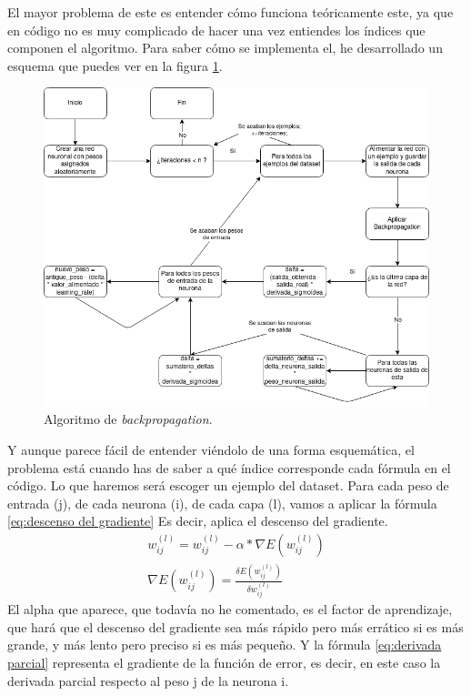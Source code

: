 El mayor problema de este es entender cómo funciona teóricamente este, ya que en código no es muy complicado de hacer una vez entiendes los índices que componen el algoritmo. Para saber cómo se implementa el, he desarrollado un esquema que puedes ver en la figura \ref{Algoritmo de backpropagation}.
\begin{figure}[h]
	\centering
	\includegraphics[width=15cm]{archivos/imagenes/Algoritmo-de-backpropagation.png}
	\caption{Algoritmo de \textit{backpropagation}.}
	\label{Algoritmo de backpropagation}
\end{figure}

Y aunque parece fácil de entender viéndolo de una forma esquemática, el problema está cuando has de saber a qué índice corresponde cada fórmula en el código. Lo que haremos será escoger un ejemplo del dataset. Para cada peso de entrada (j), de cada neurona (i), de cada capa (l), vamos a aplicar la fórmula \ref{eq:descenso del gradiente} Es decir, aplica el descenso del gradiente.
\begin{subequations}
	\begin{eqnarray}
		w_{ij}^{(l)} = w_{ij}^{(l)} - \alpha*\nabla E(w_{ij}^{(l)}) \label{eq:descenso del gradiente} \\
		\nabla E(w_{ij}^{(l)}) =  \frac{\delta E(w_{ij}^{(l)})}{\delta w_{ij}^{(l)}} \label{eq:derivada parcial}
	\end{eqnarray}
\end{subequations}
El alpha que aparece, que todavía no he comentado, es el factor de aprendizaje, que hará que el descenso del gradiente sea más rápido pero más errático si es más grande, y más lento pero preciso si es más pequeño. Y la fórmula \ref{eq:derivada parcial} representa el gradiente de la función de error, es decir, en este caso la derivada parcial respecto al peso j de la neurona i.

